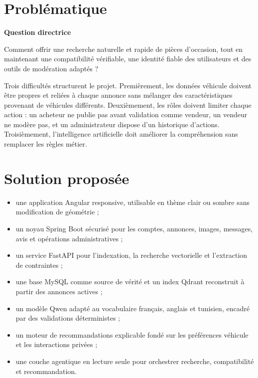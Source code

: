 \section{Problématique}

\textbf{Question directrice}

Comment offrir une recherche naturelle et rapide de pièces d'occasion, tout en maintenant une compatibilité vérifiable, une identité fiable des utilisateurs et des outils de modération adaptés ?


Trois difficultés structurent le projet. Premièrement, les données véhicule doivent être propres et reliées à chaque annonce sans mélanger des caractéristiques provenant de véhicules différents. Deuxièmement, les rôles doivent limiter chaque action : un acheteur ne publie pas avant validation comme vendeur, un vendeur ne modère pas, et un administrateur dispose d'un historique d'actions. Troisièmement, l'intelligence artificielle doit améliorer la compréhension sans remplacer les règles métier.


\section{Solution proposée}

\begin{itemize}
\item une application Angular responsive, utilisable en thème clair ou sombre sans modification de géométrie ;

\item un noyau Spring Boot sécurisé pour les comptes, annonces, images, messages, avis et opérations administratives ;

\item un service FastAPI pour l'indexation, la recherche vectorielle et l'extraction de contraintes ;

\item une base MySQL comme source de vérité et un index Qdrant reconstruit à partir des annonces actives ;

\item un modèle Qwen adapté au vocabulaire français, anglais et tunisien, encadré par des validations déterministes ;

\item un moteur de recommandations explicable fondé sur les préférences véhicule et les interactions privées ;

\item une couche agentique en lecture seule pour orchestrer recherche, compatibilité et recommandation.
\end{itemize}

